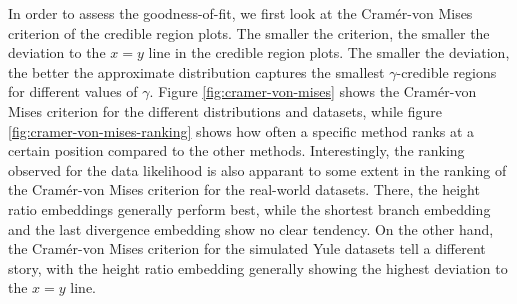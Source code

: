 \documentclass[10pt,letterpaper]{article}
\begin{document}
In order to assess the goodness-of-fit, we first look at the Cramér-von Mises criterion of the credible region plots. The smaller the criterion, the smaller the deviation to the $x=y$ line in the credible region plots. The smaller the deviation, the better the approximate distribution captures the smallest $\gamma$-credible regions for different values of $\gamma$. Figure \ref{fig:cramer-von-mises} shows the Cramér-von Mises criterion for the different distributions and datasets, while figure \ref{fig:cramer-von-mises-ranking} shows how often a specific method ranks at a certain position compared to the other methods. Interestingly, the ranking observed for the data likelihood is also apparant to some extent in the ranking of the Cramér-von Mises criterion for the real-world datasets. There, the height ratio embeddings generally perform best, while the shortest branch embedding and the last divergence embedding show no clear tendency. On the other hand, the Cramér-von Mises criterion for the simulated Yule datasets tell a different story, with the height ratio embedding generally showing the highest deviation to the $x=y$ line.
\end{document}

